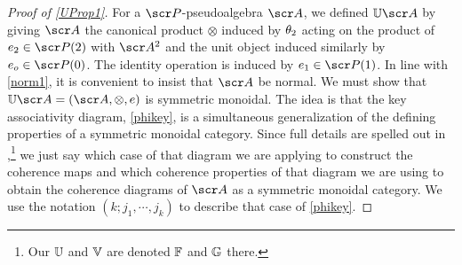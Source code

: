 \documentclass{amsart}
\theoremstyle{definition}
\numberwithin{equation}{section}
\begin{document}
\begin{proof} [Proof of \autoref{UProp1}] For a $\sP$-pseudoalgebra $\sA$, we defined $\bU \sA$ by giving $\sA$ the canonical product $\otimes$ induced by $\theta_2$ acting on the product of $e_2\in \sP(2)$  with $\sA^2$ and the unit object induced similarly by $e_o\in \sP(0)$.  The identity operation is induced by $e_1\in\sP(1)$.  In line with \autoref{norm1}, it is convenient to insist that $\sA$ be normal.  We must show that $\bU \sA = (\sA,\otimes,e)$ is symmetric monoidal.  The idea is that the key associativity diagram, \autoref{phikey}, is a simultaneous generalization of the defining properties of a symmetric monoidal category.  Since full details are spelled out  in \cite[Section 3]{LRZZ},\footnote{Our $\mathbb{U}$ and $\mathbb{V}$ are denoted $\mathbb{F}$ and $\mathbb{G}$ there.} we just say which case of that diagram we are applying to construct the coherence maps and which coherence properties of that diagram we are using to obtain the coherence diagrams of $\sA$ as a symmetric monoidal category. We use the notation $(k;j_1, \cdots, j_k)$ to describe that case of \autoref{phikey}. 


\end{proof}
\end{document}
